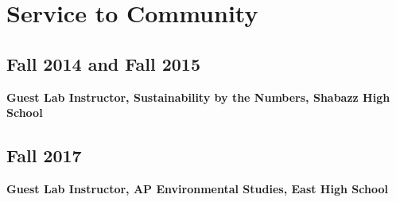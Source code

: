 \documentclass{article}
\begin{document}
\section*{Service to Community}
\label{sec:org1a4c463}
\subsection*{Fall 2014 and Fall 2015}
\label{sec:orgf7ad16e}
\textbf{Guest Lab Instructor, Sustainability by the Numbers, Shabazz High School}

\subsection*{Fall 2017}
\label{sec:org3185a85}
\textbf{Guest Lab Instructor, AP Environmental Studies, East High School}
\end{document}
